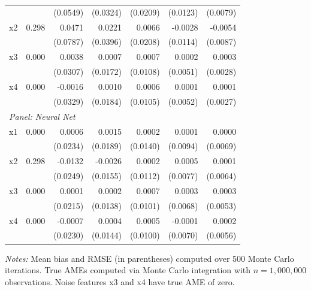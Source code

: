 \begin{table}[htbp]
\begin{threeparttable}
\begin{tabular}{lrrrrrr}
 &  & (0.0549) & (0.0324) & (0.0209) & (0.0123) & (0.0079) \\
\quad x2 & 0.298 & 0.0471 & 0.0221 & 0.0066 & -0.0028 & -0.0054 \\
 &  & (0.0787) & (0.0396) & (0.0208) & (0.0114) & (0.0087) \\
\quad x3 & 0.000 & 0.0038 & 0.0007 & 0.0007 & 0.0002 & 0.0003 \\
 &  & (0.0307) & (0.0172) & (0.0108) & (0.0051) & (0.0028) \\
\quad x4 & 0.000 & -0.0016 & 0.0010 & 0.0006 & 0.0001 & 0.0001 \\
 &  & (0.0329) & (0.0184) & (0.0105) & (0.0052) & (0.0027) \\
\midrule
\multicolumn{7}{l}{\textit{Panel: Neural Net}} \\
\quad x1 & 0.000 & 0.0006 & 0.0015 & 0.0002 & 0.0001 & 0.0000 \\
 &  & (0.0234) & (0.0189) & (0.0140) & (0.0094) & (0.0069) \\
\quad x2 & 0.298 & -0.0132 & -0.0026 & 0.0002 & 0.0005 & 0.0001 \\
 &  & (0.0249) & (0.0155) & (0.0112) & (0.0077) & (0.0064) \\
\quad x3 & 0.000 & 0.0001 & 0.0002 & 0.0007 & 0.0003 & 0.0003 \\
 &  & (0.0215) & (0.0138) & (0.0101) & (0.0068) & (0.0053) \\
\quad x4 & 0.000 & -0.0007 & 0.0004 & 0.0005 & -0.0001 & 0.0002 \\
 &  & (0.0230) & (0.0144) & (0.0100) & (0.0070) & (0.0056) \\
\bottomrule
\end{tabular}
\begin{tablenotes}
\footnotesize
\item \textit{Notes:} Mean bias and RMSE (in parentheses) computed over 500 Monte Carlo iterations. True AMEs computed via Monte Carlo integration with $n=1{,}000{,}000$ observations. Noise features x3 and x4 have true AME of zero.
\end{tablenotes}
\end{threeparttable}
\end{table}
